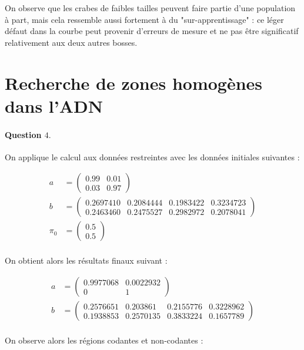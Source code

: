 \documentclass[12pt,a4paper]{article}
\begin{document}
On observe que les crabes de faibles tailles peuvent faire partie d'une population à part, mais cela ressemble aussi fortement à du "sur-apprentissage" : ce léger défaut dans la courbe peut provenir d'erreurs de mesure et ne pas être significatif relativement aux deux autres bosses.

\section{Recherche de zones homogènes dans l'\textsc{ADN}}

\paragraph*{Question $4.$} On applique le calcul aux données restreintes avec les données initiales suivantes :

\begin{align*}
a &= \begin{pmatrix}
0.99 & 0.01 \\
0.03 & 0.97
\end{pmatrix} \\
b &= \begin{pmatrix}
0.2697410 & 0.2084444 & 0.1983422 & 0.3234723 \\
0.2463460 & 0.2475527 & 0.2982972 & 0.2078041
\end{pmatrix}\\
\pi_0 &= \begin{pmatrix}
0.5 \\
0.5
\end{pmatrix} \\
\end{align*}

On obtient alors les résultats finaux suivant :

\begin{align*}
a &= \begin{pmatrix}
0.9977068 & 0.0022932 \\
0 		  & 1
\end{pmatrix} \\
b &= \begin{pmatrix}
0.2576651 & 0.203861  & 0.2155776 & 0.3228962 \\
0.1938853 & 0.2570135 & 0.3833224 & 0.1657789
\end{pmatrix}\\
\end{align*}

On observe alors les régions codantes et non-codantes :
\end{document}
